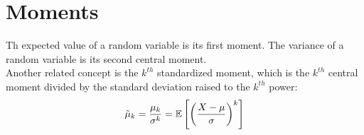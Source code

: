 \section{Moments}

Th expected value of a random variable is its first moment.
The variance of a random variable is its second central moment. \\
Another related concept is the $k^{th}$ standardized moment, which is the $k^{th}$ central moment divided by the standard deviation raised to the $k^{th}$ power:
\begin{equation*}
    \tilde{\mu}_k = \frac{\mu_k}{\sigma^k} = \mathbb{E}\left[\left(\frac{X-\mu}{\sigma}\right)^k\right]
\end{equation*}
